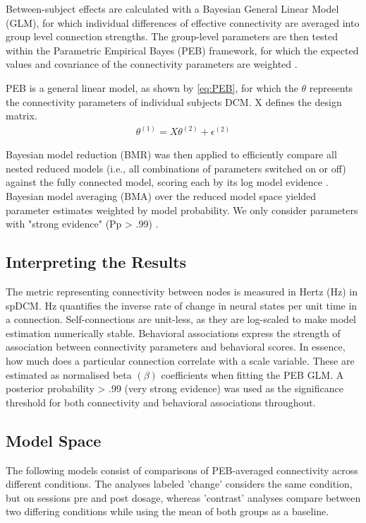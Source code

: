 \documentclass{article}
\begin{document}
Between-subject effects are calculated with a Bayesian General Linear Model (GLM), for which individual differences of effective connectivity are averaged into group level connection strengths. The group-level parameters are then tested within the Parametric Empirical Bayes (PEB) framework, for which the expected values and covariance of the connectivity parameters are weighted \citep{friston_bayesian_2016}. 

PEB is a general linear model, as shown by \ref{eq:PEB}, for which the $\theta$ represents the connectivity parameters of individual subjects DCM. X defines the design matrix. 
\begin{align} \label{eq:PEB}
    \theta ^{(1)}=X\theta ^{(2)}+\epsilon ^{(2)}
\end{align}

Bayesian model reduction (BMR) was then applied to efficiently compare all nested reduced models (i.e., all combinations of parameters switched on or off) against the fully connected model, scoring each by its log model evidence \citep{friston_bayesian_2016, zeidman_guide_2019}. Bayesian model averaging (BMA) over the reduced model space yielded parameter estimates weighted by model probability. We only consider parameters with "strong evidence" (Pp > .99) \citep{kass_bayes_1995}. 

\subsection{Interpreting the Results}

The metric representing connectivity between nodes is measured in Hertz (Hz) in spDCM. Hz quantifies the inverse rate of change in neural states per unit time in a connection. Self-connections are unit-less, as they are log-scaled to make model estimation numerically stable. Behavioral associations express the strength of association between connectivity parameters and behavioral scores. In essence, how much does a particular connection correlate with a scale variable. These are estimated as normalised beta $(\beta)$ coefficients when fitting the PEB GLM. A posterior probability > .99 (very strong evidence) was used as the significance threshold for both connectivity and behavioral associations throughout.

\subsection{Model Space}

The following models consist of comparisons of PEB-averaged connectivity across different conditions. The analyses labeled 'change' considers the same condition, but on sessions pre and post dosage, whereas 'contrast' analyses compare between two differing conditions while using the mean of both groups as a baseline. 
\end{document}
